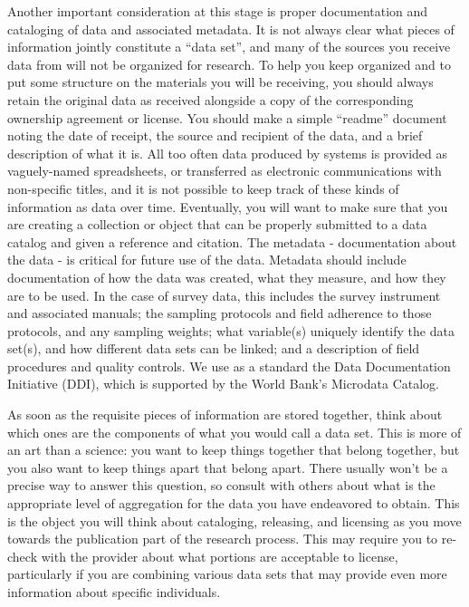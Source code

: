 Another important consideration at this stage is 
proper documentation and cataloging of data and associated metadata.
It is not always clear what pieces of information jointly constitute a ``data set'',
and many of the sources you receive data from will not be organized for research.
To help you keep organized and to put some structure on the materials you will be receiving,
you should always retain the original data as received
alongside a copy of the corresponding ownership agreement or license.
You should make a simple ``readme'' document noting the date of receipt,
the source and recipient of the data, and a brief description of what it is.
All too often data produced by systems is provided as vaguely-named spreadsheets,
or transferred as electronic communications with non-specific titles,
and it is not possible to keep track of these kinds of information as data over time.
Eventually, you will want to make sure that you are creating a collection or object
that can be properly submitted to a data catalog and given a reference and citation.
The metadata - documentation about the data - is critical for future use of the data.
Metadata should include documentation of how the data was created, 
what they measure, and how they are to be used.
In the case of survey data, this includes the survey instrument and associated manuals; 
the sampling protocols and field adherence to those protocols, and any sampling weights;
what variable(s) uniquely identify the data set(s), and how different data sets can be linked;
and a description of field procedures and quality controls. 
We use as a standard the Data Documentation Initiative (DDI), which is supported by the 
World Bank's Microdata Catalog.

As soon as the requisite pieces of information are stored together,
think about which ones are the components of what you would call a data set.
This is more of an art than a science:
you want to keep things together that belong together,
but you also want to keep things apart that belong apart.
There usually won't be a precise way to answer this question,
so consult with others about what is the appropriate level of aggregation
for the data you have endeavored to obtain.
This is the object you will think about cataloging, releasing, and licensing
as you move towards the publication part of the research process.
This may require you to re-check with the provider
about what portions are acceptable to license,
particularly if you are combining various data sets
that may provide even more information about specific individuals.

